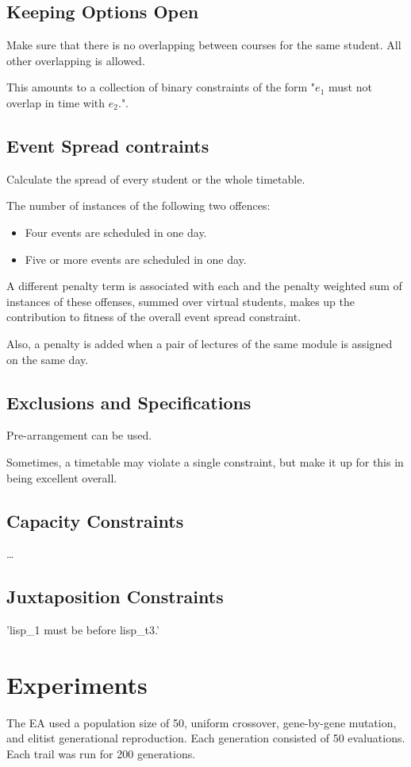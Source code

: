 \documentclass[12pt]{book}
\begin{document}
\subsection{Keeping Options Open}
Make sure that there is no overlapping between courses for the same student. All other overlapping is allowed.

This amounts to a collection of binary constraints of the form "$e_1$ must not overlap in time with $e_2$.".

\subsection{Event Spread contraints}
Calculate the spread of every student or the whole timetable.

The number of instances of the following two offences:
\begin{itemize}
\item Four events are scheduled in one day.
\item Five or more events are scheduled in one day.
\end{itemize}
A different penalty term is associated with each and the penalty weighted sum of instances of these offenses, summed over virtual students, makes up the contribution to fitness of the overall event spread constraint.

Also, a penalty is added when a pair of lectures of the same module is assigned on the same day.

\subsection{Exclusions and Specifications}
Pre-arrangement can be used.

Sometimes, a timetable may violate a single constraint, but make it up for this in being excellent overall.

\subsection{Capacity Constraints}
\dots

\subsection{Juxtaposition Constraints}
'lisp\_1 must be before lisp\_t3.'

\section{Experiments}
The EA used a population size of 50, uniform crossover, gene-by-gene mutation, and elitist generational reproduction. Each generation consisted of 50 evaluations. Each trail was run for 200 generations.
\end{document}
